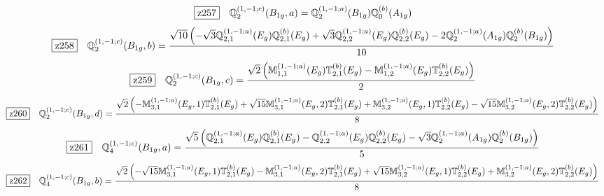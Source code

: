 \documentclass[fleqn,10pt,landscape]{jsarticle}
\begin{document}
\begin{dmath*}
\hspace*{3mm}\fbox{z257}\quad \mathbb{Q}_{2}^{(1,-1;c)}(B_{1g},a)=\mathbb{Q}_{2}^{(1,-1;a)}(B_{1g}) \mathbb{Q}_{0}^{(b)}(A_{1g})
\end{dmath*}
\begin{dmath*}
\hspace*{3mm}\fbox{z258}\quad \mathbb{Q}_{2}^{(1,-1;c)}(B_{1g},b)=\frac{\sqrt{10} \left(- \sqrt{3} \mathbb{Q}_{2,1}^{(1,-1;a)}(E_{g}) \mathbb{Q}_{2,1}^{(b)}(E_{g}) + \sqrt{3} \mathbb{Q}_{2,2}^{(1,-1;a)}(E_{g}) \mathbb{Q}_{2,2}^{(b)}(E_{g}) - 2 \mathbb{Q}_{2}^{(1,-1;a)}(A_{1g}) \mathbb{Q}_{2}^{(b)}(B_{1g})\right)}{10}
\end{dmath*}
\begin{dmath*}
\hspace*{3mm}\fbox{z259}\quad \mathbb{Q}_{2}^{(1,-1;c)}(B_{1g},c)=\frac{\sqrt{2} \left(\mathbb{M}_{1,1}^{(1,-1;a)}(E_{g}) \mathbb{T}_{2,1}^{(b)}(E_{g}) - \mathbb{M}_{1,2}^{(1,-1;a)}(E_{g}) \mathbb{T}_{2,2}^{(b)}(E_{g})\right)}{2}
\end{dmath*}
\begin{dmath*}
\hspace*{3mm}\fbox{z260}\quad \mathbb{Q}_{2}^{(1,-1;c)}(B_{1g},d)=\frac{\sqrt{2} \left(- \mathbb{M}_{3,1}^{(1,-1;a)}(E_{g},1) \mathbb{T}_{2,1}^{(b)}(E_{g}) + \sqrt{15} \mathbb{M}_{3,1}^{(1,-1;a)}(E_{g},2) \mathbb{T}_{2,1}^{(b)}(E_{g}) + \mathbb{M}_{3,2}^{(1,-1;a)}(E_{g},1) \mathbb{T}_{2,2}^{(b)}(E_{g}) - \sqrt{15} \mathbb{M}_{3,2}^{(1,-1;a)}(E_{g},2) \mathbb{T}_{2,2}^{(b)}(E_{g})\right)}{8}
\end{dmath*}
\begin{dmath*}
\hspace*{3mm}\fbox{z261}\quad \mathbb{Q}_{4}^{(1,-1;c)}(B_{1g},a)=\frac{\sqrt{5} \left(\mathbb{Q}_{2,1}^{(1,-1;a)}(E_{g}) \mathbb{Q}_{2,1}^{(b)}(E_{g}) - \mathbb{Q}_{2,2}^{(1,-1;a)}(E_{g}) \mathbb{Q}_{2,2}^{(b)}(E_{g}) - \sqrt{3} \mathbb{Q}_{2}^{(1,-1;a)}(A_{1g}) \mathbb{Q}_{2}^{(b)}(B_{1g})\right)}{5}
\end{dmath*}
\begin{dmath*}
\hspace*{3mm}\fbox{z262}\quad \mathbb{Q}_{4}^{(1,-1;c)}(B_{1g},b)=\frac{\sqrt{2} \left(- \sqrt{15} \mathbb{M}_{3,1}^{(1,-1;a)}(E_{g},1) \mathbb{T}_{2,1}^{(b)}(E_{g}) - \mathbb{M}_{3,1}^{(1,-1;a)}(E_{g},2) \mathbb{T}_{2,1}^{(b)}(E_{g}) + \sqrt{15} \mathbb{M}_{3,2}^{(1,-1;a)}(E_{g},1) \mathbb{T}_{2,2}^{(b)}(E_{g}) + \mathbb{M}_{3,2}^{(1,-1;a)}(E_{g},2) \mathbb{T}_{2,2}^{(b)}(E_{g})\right)}{8}
\end{dmath*}
\end{document}
